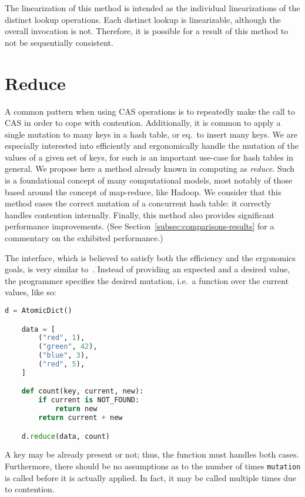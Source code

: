 The linearization of this method is intended as the individual linearizations of the distinct lookup operations.
Each distinct lookup is linearizable, although the overall invocation is not.
Therefore, it is possible for a result of this method to not be sequentially consistent.


\section{Reduce}\label{sec:reduce}

A common pattern when using CAS operations is to repeatedly make the call to CAS in order to cope with contention.
Additionally, it is common to apply a single mutation to many keys in a hash table, or eq.\ to insert many keys.
We are especially interested into efficiently and ergonomically handle the mutation of the values of a given set of keys, for such is an important use-case for hash tables in general.
We propose here a method already known in computing as \emph{reduce}.
Such is a foundational concept of many computational models, most notably of those based around the concept of map-reduce, like Hadoop.
We consider that this method eases the correct mutation of a concurrent hash table: it correctly handles contention internally.
Finally, this method also provides significant performance improvements.
(See Section~\ref{subsec:comparisons-results} for a commentary on the exhibited performance.)

The interface, which is believed to satisfy both the efficiency and the ergonomics goals, is very similar to~\cite[Algorithm~1]{maier}.
Instead of providing an expected and a desired value, the programmer specifies the desired mutation, i.e.\ a function over the current values, like so:
\begin{lstlisting}[label={lst:reduce-usage}, language=Python]
    d = AtomicDict()

    data = [
        ("red", 1),
        ("green", 42),
        ("blue", 3),
        ("red", 5),
    ]

    def count(key, current, new):
        if current is NOT_FOUND:
            return new
        return current + new

    d.reduce(data, count)
\end{lstlisting}
A key may be already present or not; thus, the function must handles both cases.
Furthermore, there should be no assumptions as to the number of times \texttt{mutation} is called before it is actually applied.
In fact, it may be called multiple times due to contention.

